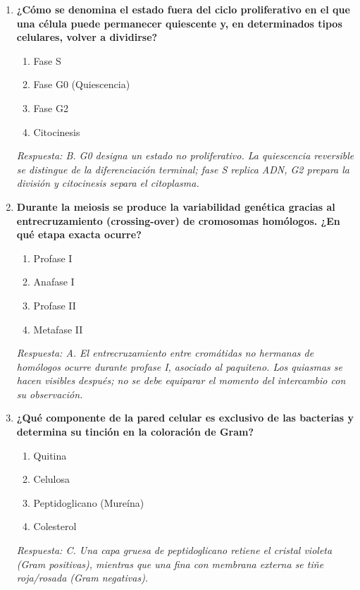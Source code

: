 \begin{enumerate}[label=\textbf{\arabic*.}]
    \item \textbf{¿Cómo se denomina el estado fuera del ciclo proliferativo en el que una célula puede permanecer quiescente y, en determinados tipos celulares, volver a dividirse?}
    \begin{enumerate}
        \item[A)] Fase S
        \item[B)] Fase G0 (Quiescencia)
        \item[C)] Fase G2
        \item[D)] Citocinesis
    \end{enumerate}
    \textit{Respuesta: B. G0 designa un estado no proliferativo. La quiescencia reversible se distingue de la diferenciación terminal; fase S replica ADN, G2 prepara la división y citocinesis separa el citoplasma.}

    \item \textbf{Durante la meiosis se produce la variabilidad genética gracias al entrecruzamiento (crossing-over) de cromosomas homólogos. ¿En qué etapa exacta ocurre?}
    \begin{enumerate}
        \item[A)] Profase I
        \item[B)] Anafase I
        \item[C)] Profase II
        \item[D)] Metafase II
    \end{enumerate}
    \textit{Respuesta: A. El entrecruzamiento entre cromátidas no hermanas de homólogos ocurre durante profase I, asociado al paquiteno. Los quiasmas se hacen visibles después; no se debe equiparar el momento del intercambio con su observación.}

    \item \textbf{¿Qué componente de la pared celular es exclusivo de las bacterias y determina su tinción en la coloración de Gram?}
    \begin{enumerate}
        \item[A)] Quitina
        \item[B)] Celulosa
        \item[C)] Peptidoglicano (Mureína)
        \item[D)] Colesterol
    \end{enumerate}
    \textit{Respuesta: C. Una capa gruesa de peptidoglicano retiene el cristal violeta (Gram positivas), mientras que una fina con membrana externa se tiñe roja/rosada (Gram negativas).}


\end{enumerate}
